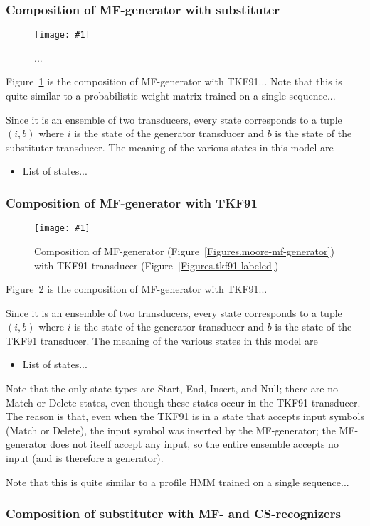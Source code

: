 \documentclass{article}
\newcommand{\figref}[1]{Figure~\ref{Figures.#1}}
\newcommand{\figlabel}[1]{\label{Figures.#1}}
\newcommand{\easyfig}[4]{
\begin{figure}
\texttt{[image: \#1]}
\caption{ \figlabel{#3} #4}
\end{figure}}
\newcommand{\pdffig}[2]{\easyfig{#1-fig.pdf}{}{#1}{#2}}
\newcommand{\tallpdffig}[2]{\easyfig{#1-fig.pdf}{height=\textheight}{#1}{#2}}
\begin{document}
\subsubsection{Composition of MF-generator with substituter}
\pdffig{mf-substituter}{...}

\figref{mf-substituter} is the composition of MF-generator with TKF91...
Note that this is quite similar to a probabilistic weight matrix trained on a single sequence...

Since it is an ensemble of two transducers, every state corresponds to a tuple $(i,b)$
where
$i$ is the state of the generator transducer and
$b$ is the state of the substituter transducer.
The meaning of the various states in this model are
\begin{itemize}
\item List of states...
\end{itemize}

\subsubsection{Composition of MF-generator with TKF91}
\tallpdffig{mf-tkf91}{Composition of MF-generator (\figref{moore-mf-generator}) with TKF91 transducer (\figref{tkf91-labeled})}

\figref{mf-tkf91} is the composition of MF-generator with TKF91...

Since it is an ensemble of two transducers, every state corresponds to a tuple $(i,b)$
where
$i$ is the state of the generator transducer and
$b$ is the state of the TKF91 transducer.
The meaning of the various states in this model are
\begin{itemize}
\item List of states...
\end{itemize}

Note that the only state types are Start, End, Insert, and Null;
there are no Match or Delete states, even though these states occur in the TKF91 transducer.
The reason is that, even when the TKF91 is in a state that accepts input symbols (Match or Delete),
the input symbol was inserted by the MF-generator;
the MF-generator does not itself accept any input,
so the entire ensemble accepts no input
(and is therefore a generator).

Note that this is quite similar to a profile HMM trained on a single sequence...

\subsubsection{Composition of substituter with MF- and CS-recognizers}
\end{document}
